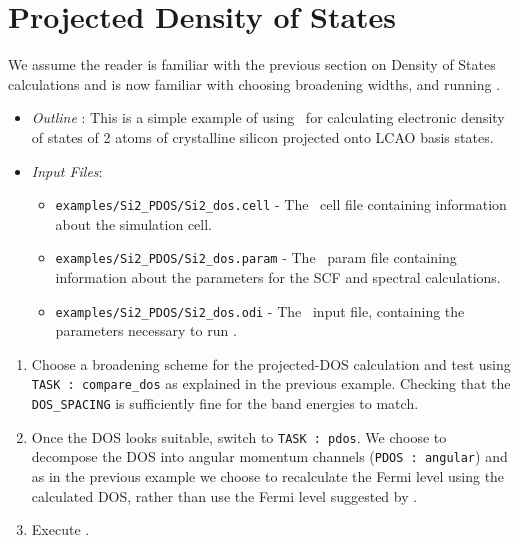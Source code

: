 \documentclass[a4paper,11pt,twoside]{book}
\begin{document}
{\section{Projected Density of States}
We assume the reader is familiar with the previous section on Density of States calculations and is now familiar with choosing broadening widths, and running \optados. 
\begin{itemize}
\item \emph{Outline} : This is a simple example of using \optados\ for calculating electronic density of states of 2 atoms of crystalline silicon projected onto LCAO basis states.
\item \emph{Input Files}:
\begin{itemize}
\item \verb#examples/Si2_PDOS/Si2_dos.cell# - The \castep\ cell file containing information about the simulation cell.
\item \verb#examples/Si2_PDOS/Si2_dos.param# - The \castep\ param file containing information about the parameters for the SCF and spectral calculations.
\item \verb#examples/Si2_PDOS/Si2_dos.odi# - The \optados\ input file, containing the parameters necessary to run \optados.
\end{itemize}
\end{itemize}

\begin{enumerate}

\item Choose a broadening scheme for the projected-DOS calculation and test using {\tt TASK : compare\_dos} as explained in the previous example. Checking that the  {\tt DOS\_SPACING} is sufficiently fine for the band energies to match.

\item Once the DOS looks suitable, switch to  {\tt TASK : pdos}. We choose to decompose the DOS into angular momentum channels ({\tt PDOS : angular}) and as in the previous example we choose to recalculate the Fermi level using the calculated DOS, rather than use the Fermi level suggested by \castep. 

\item Execute \optados.


\end{enumerate}}
\end{document}
